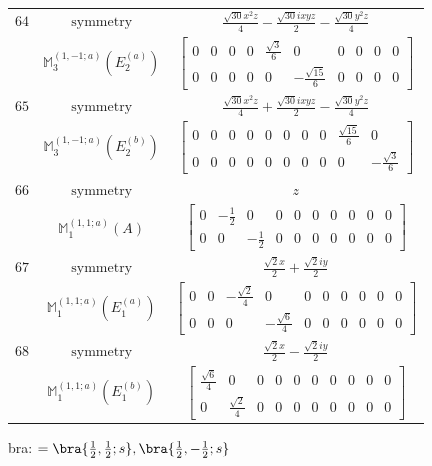 \documentclass[fleqn,8pt,landscape]{jsarticle}
\begin{document}
\begin{longtable}{ccc}
$ 64 $ & $ \text{symmetry} $ & $ \frac{\sqrt{30} x^{2} z}{4} - \frac{\sqrt{30} i x y z}{2} - \frac{\sqrt{30} y^{2} z}{4} $ \\
$  $ & $ \mathbb{M}_{3}^{(1,-1;a)}(E_{2}^{(a)}) $ & $ \begin{bmatrix} 0 & 0 & 0 & 0 & \frac{\sqrt{3}}{6} & 0 & 0 & 0 & 0 & 0 \\ 0 & 0 & 0 & 0 & 0 & - \frac{\sqrt{15}}{6} & 0 & 0 & 0 & 0 \end{bmatrix} $ \\ \hline
$ 65 $ & $ \text{symmetry} $ & $ \frac{\sqrt{30} x^{2} z}{4} + \frac{\sqrt{30} i x y z}{2} - \frac{\sqrt{30} y^{2} z}{4} $ \\
$  $ & $ \mathbb{M}_{3}^{(1,-1;a)}(E_{2}^{(b)}) $ & $ \begin{bmatrix} 0 & 0 & 0 & 0 & 0 & 0 & 0 & 0 & \frac{\sqrt{15}}{6} & 0 \\ 0 & 0 & 0 & 0 & 0 & 0 & 0 & 0 & 0 & - \frac{\sqrt{3}}{6} \end{bmatrix} $ \\ \hline
$ 66 $ & $ \text{symmetry} $ & $ z $ \\
$  $ & $ \mathbb{M}_{1}^{(1,1;a)}(A) $ & $ \begin{bmatrix} 0 & - \frac{1}{2} & 0 & 0 & 0 & 0 & 0 & 0 & 0 & 0 \\ 0 & 0 & - \frac{1}{2} & 0 & 0 & 0 & 0 & 0 & 0 & 0 \end{bmatrix} $ \\ \hline
$ 67 $ & $ \text{symmetry} $ & $ \frac{\sqrt{2} x}{2} + \frac{\sqrt{2} i y}{2} $ \\
$  $ & $ \mathbb{M}_{1}^{(1,1;a)}(E_{1}^{(a)}) $ & $ \begin{bmatrix} 0 & 0 & - \frac{\sqrt{2}}{4} & 0 & 0 & 0 & 0 & 0 & 0 & 0 \\ 0 & 0 & 0 & - \frac{\sqrt{6}}{4} & 0 & 0 & 0 & 0 & 0 & 0 \end{bmatrix} $ \\ \hline
$ 68 $ & $ \text{symmetry} $ & $ \frac{\sqrt{2} x}{2} - \frac{\sqrt{2} i y}{2} $ \\
$  $ & $ \mathbb{M}_{1}^{(1,1;a)}(E_{1}^{(b)}) $ & $ \begin{bmatrix} \frac{\sqrt{6}}{4} & 0 & 0 & 0 & 0 & 0 & 0 & 0 & 0 & 0 \\ 0 & \frac{\sqrt{2}}{4} & 0 & 0 & 0 & 0 & 0 & 0 & 0 & 0 \end{bmatrix} $ \\ \hline
\end{longtable}
bra: $=\bra{\frac{1}{2},\frac{1}{2};s}, \bra{\frac{1}{2},- \frac{1}{2};s}$
\end{document}
